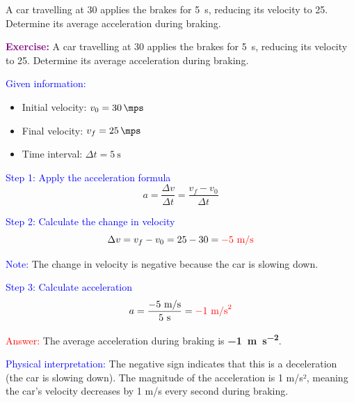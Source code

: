 \begin{exercise}
    A car travelling at \qty{30}{\mps} applies the brakes for \qty{5}{\s}, reducing its velocity to \qty{25}{\mps}. Determine its average acceleration during braking.
    \begin{solu}
        \textbf{\textcolor{purple}{Exercise:}} A car travelling at \qty{30}{\mps} applies the brakes for \qty{5}{\s}, reducing its velocity to \qty{25}{\mps}. Determine its average acceleration during braking.

        \vspace{0.3cm}

        \textcolor{blue}{Given information:}
        \begin{itemize}
            \item Initial velocity: $v_0 = \qty{30}{\mps}$
            \item Final velocity: $v_f = \qty{25}{\mps}$
            \item Time interval: $\Delta t = \qty{5}{\s}$
        \end{itemize}

        \textcolor{blue}{Step 1: Apply the acceleration formula}
        \[
            \boxed{a = \frac{\Delta v}{\Delta t} = \frac{v_f - v_0}{\Delta t}}
        \]

        \textcolor{blue}{Step 2: Calculate the change in velocity}
        \[
            \Delta v = v_f - v_0 = 25 - 30 = \textcolor{red}{-5 \text{ m/s}}
        \]

        \textcolor{blue}{Note:} The change in velocity is negative because the car is slowing down.

        \textcolor{blue}{Step 3: Calculate acceleration}
        \[
            a = \frac{-5 \text{ m/s}}{5 \text{ s}} = \textcolor{red}{-1 \text{ m/s}^2}
        \]

        \textcolor{red}{Answer:} The average acceleration during braking is \textbf{\qty{-1}{\metre\per\second\squared}}.

        \textcolor{blue}{Physical interpretation:} The negative sign indicates that this is a deceleration (the car is slowing down). The magnitude of the acceleration is 1 m/s², meaning the car's velocity decreases by 1 m/s every second during braking.
    \end{solu}
\end{exercise}


